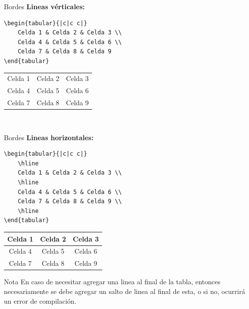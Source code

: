 \documentclass[../slides.tex]{subfiles}
\begin{document}
    \begin{frame}[fragile]{Bordes}
        \textbf{Lineas vérticales:}         
            \begin{verbatim}
\begin{tabular}{|c|c c|}
    Celda 1 & Celda 2 & Celda 3 \\ 
    Celda 4 & Celda 5 & Celda 6 \\  
    Celda 7 & Celda 8 & Celda 9    
\end{tabular}
            \end{verbatim}
            
\begin{tabular}{|c|c c|}
    Celda 1 & Celda 2 & Celda 3 \\ 
    Celda 4 & Celda 5 & Celda 6 \\  
    Celda 7 & Celda 8 & Celda 9    
\end{tabular}\\[\baselineskip]
    \end{frame}

    \begin{frame}[fragile]{Bordes}
        \textbf{Lineas horizontales:}         
            \begin{verbatim}
\begin{tabular}{|c|c c|}
    \hline
    Celda 1 & Celda 2 & Celda 3 \\
    \hline
    Celda 4 & Celda 5 & Celda 6 \\  
    Celda 7 & Celda 8 & Celda 9 \\
    \hline
\end{tabular}
            \end{verbatim}
            
\begin{tabular}{|c|c c|}
    \hline
    Celda 1 & Celda 2 & Celda 3 \\
    \hline
    Celda 4 & Celda 5 & Celda 6 \\  
    Celda 7 & Celda 8 & Celda 9 \\
    \hline
\end{tabular}
    \begin{block}{Nota}
        En caso de necesitar agregar una linea al final de la tabla, entonces necesariamente se debe agregar un salto de linea al final de esta, o si no, ocurrirá un error de compilación.
    \end{block}
    \end{frame}
\end{document}
